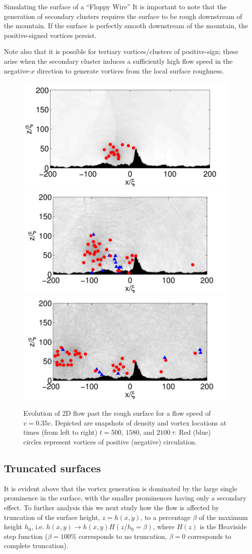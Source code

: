 \begin{chapter}{\label{cha:afm}Simulating the surface of a ``Floppy Wire''}
It is important to note that the generation of secondary clusters requires the surface to be rough downstream of the mountain.  If the surface is perfectly smooth downstream of the mountain, the positive-signed vortices persist.  

Note also that it is possible for tertiary vortices/clusters of positive-sign; these arise when the secondary cluster induces a sufficiently high flow speed in the negative-$x$ direction to generate vortices from the local surface roughness.
\begin{figure}
\includegraphics[width=0.35\linewidth]{./afm/figures/prog-35-500}\hspace{-0.6cm}
\includegraphics[width=0.35\linewidth]{./afm/figures/prog-35-1580}\hspace{-0.6cm}
\includegraphics[width=0.35\linewidth]{./afm/figures/prog-35-2100}
\caption{\label{fig:prog} Evolution of 2D flow past the rough surface for a flow speed of $v=0.35c$.  Depicted are snapshots of density and vortex locations at times (from left to right) $t=500$, $1580$, and $2100~\tau$.  Red (blue) circles represent vortices of positive (negative) circulation.  }%
\end{figure}

\subsection{Truncated surfaces}
It is evident above that the vortex generation is dominated by the large single prominence in the surface, with the smaller prominences having only a secondary effect.  To further analysis this we next study how the flow is affected by truncation of the surface height, $z=h(x,y)$, to a percentage $\beta$ of the maximum height $h_0$, i.e. $h(x,y) \rightarrow h(x,y) H(z/h_0=\beta)$, where $H(z)$ is the Heaviside step function ($\beta=100\%$ corresponds to no truncation, $\beta=0$ corresponds to complete truncation).


\end{chapter}
